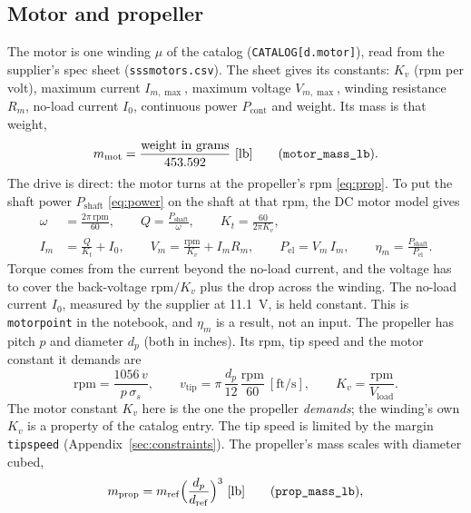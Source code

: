 \documentclass[11pt,a4paper]{article}
\renewcommand{\_}{\textunderscore\allowbreak}
\newcommand{\code}[1]{\texttt{#1}}
\newcommand{\Pshaft}{P_{\mathrm{shaft}}}
\newcommand{\Vload}{V_{\mathrm{load}}}
\begin{document}
\subsection{Motor and propeller}
The motor is one winding $\mu$ of the catalog (\code{CATALOG[d.motor]}), read from the supplier's spec sheet (\code{sss\_motors.csv}). The sheet gives its constants:
$K_v$ (rpm per volt), maximum current $I_{m,\max}$, maximum voltage $V_{m,\max}$, winding resistance $R_m$, no-load current $I_0$, continuous power $P_{\mathrm{cont}}$ and weight. Its mass is that weight,
\begin{equation}
  m_{\mathrm{mot}} = \frac{\text{weight in grams}}{453.592}\ [\mathrm{lb}] \qquad (\code{motor\_mass\_lb}).
  \label{eq:motor}
\end{equation}
The drive is direct: the motor turns at the propeller's rpm \eqref{eq:prop}. To put the shaft power $\Pshaft$ \eqref{eq:power} on the shaft at that rpm, the DC motor model gives
\begin{align}
  \omega &= \frac{2\pi\,\mathrm{rpm}}{60}, \qquad Q = \frac{\Pshaft}{\omega}, \qquad K_t = \frac{60}{2\pi K_v}, \label{eq:dctorque}\\
  I_m &= \frac{Q}{K_t} + I_0, \qquad V_m = \frac{\mathrm{rpm}}{K_v} + I_m R_m, \qquad
  P_{\mathrm{el}} = V_m\,I_m, \qquad \eta_m = \frac{\Pshaft}{P_{\mathrm{el}}}. \label{eq:dcmotor}
\end{align}
Torque comes from the current beyond the no-load current, and the voltage has to cover the back-voltage $\mathrm{rpm}/K_v$ plus the drop across the winding. The no-load current $I_0$, measured by the supplier at 11.1~V,
is held constant. This is \code{motor\_point} in the notebook, and $\eta_m$ is a result, not an input.
The propeller has pitch $p$ and diameter $d_p$ (both in inches). Its rpm, tip speed and the motor constant it demands are
\begin{equation}
  \mathrm{rpm} = \frac{1056\,v}{p\,\sigma_s}, \qquad
  v_{\mathrm{tip}} = \pi\,\frac{d_p}{12}\,\frac{\mathrm{rpm}}{60}\ [\mathrm{ft/s}], \qquad
  K_v = \frac{\mathrm{rpm}}{\Vload}.
  \label{eq:prop}
\end{equation}
The motor constant $K_v$ here is the one the propeller \emph{demands}; the winding's own $K_v$ is a property of the catalog entry. The tip speed is limited by the margin \code{tip\_speed} (Appendix~\ref{sec:constraints}). The propeller's mass scales with diameter cubed,
\begin{equation}
  m_{\mathrm{prop}} = m_{\mathrm{ref}}\Bigl(\frac{d_p}{d_{\mathrm{ref}}}\Bigr)^{3}\ [\mathrm{lb}] \qquad (\code{prop\_mass\_lb}),
  \label{eq:propmass}
\end{equation}
\end{document}
